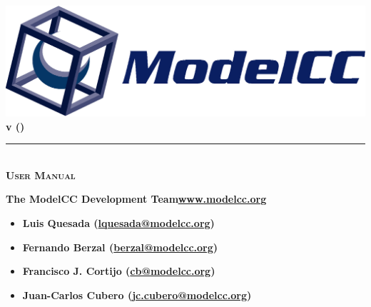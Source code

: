 \documentclass[a4paper,twoside,onecolumn]{article}
\newcommand{\pb}{\newpage}
\newcommand{\empt}{\pb \thispagestyle{empty} \rule[0mm]{0mm}{0mm} \pb}
\begin{document}
\begin{titlepage}

\begin{center}

\rule{0cm}{3cm}
\includegraphics[width=1.00\textwidth]{logo.eps}\\[-1.5cm]
\hfill {\color{blueback} \bf v (\unskip)} \rule{0.17cm}{0cm}\\[2cm]

\textsc{\color{blueback} \bf \Huge User Manual}\\[0.2cm]
\rule{0cm}{1cm}

\end{center}

\rule{0cm}{9cm}
{\color{blueback} \bf\LARGE\unskip The ModelCC Development Team\hfill {\large \href{http://www.modelcc.org/}{www.modelcc.org}}}
\begin{itemize}
\item[\color{blueback}\scalebox{0.9}{\textbullet}] {\color{blueback} \bf\large Luis Quesada (\href{mailto:lquesada@modelcc.org}{lquesada@modelcc.org})}
\item[\color{blueback}\scalebox{0.9}{\textbullet}] {\color{blueback} \bf\large Fernando Berzal (\href{mailto:berzal@modelcc.org}{berzal@modelcc.org})}
\item[\color{blueback}\scalebox{0.9}{\textbullet}] {\color{blueback} \bf\large Francisco J. Cortijo (\href{mailto:cb@modelcc.org}{cb@modelcc.org})}
\item[\color{blueback}\scalebox{0.9}{\textbullet}] {\color{blueback} \bf\large Juan-Carlos Cubero (\href{mailto:jc.cubero@modelcc.org}{jc.cubero@modelcc.org})}
\end{itemize}

\end{titlepage}





%
%
\end{document}
